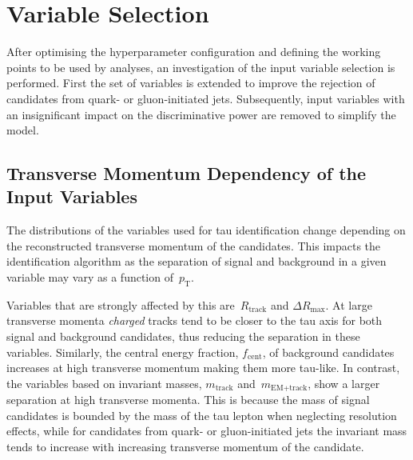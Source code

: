 \section{Variable Selection}
\label{sec:bdt_variable_selection}

After optimising the hyperparameter configuration and defining the working
points to be used by analyses, an investigation of the input variable selection
is performed. First the set of variables is extended to improve the rejection of
\tauhadvis candidates from quark- or gluon-initiated jets. Subsequently, input
variables with an insignificant impact on the discriminative power are removed
to simplify the model.

\subsection{Transverse Momentum Dependency of the Input Variables}
\label{sec:bdt_incl_pt}


The distributions of the variables used for tau identification change depending
on the reconstructed transverse momentum of the \tauhadvis candidates. This
impacts the identification algorithm as the separation of signal and background
in a given variable may vary as a function of~$p_\text{T}$.

Variables that are strongly affected by this are~$R_\text{track}$ and
$\Delta R_\text{max}$. At large transverse momenta \emph{charged} tracks tend to
be closer to the tau axis for both signal and background candidates, thus
reducing the separation in these variables. Similarly, the central energy
fraction, $f_\text{cent}$, of background candidates increases at high transverse
momentum making them more tau-like. In contrast, the variables based on
invariant masses, $m_\text{track}$ and~$m_\text{EM+track}$, show a larger
separation at high transverse momenta. This is because the mass of signal
candidates is bounded by the mass of the tau lepton when neglecting resolution
effects, while for candidates from quark- or gluon-initiated jets the invariant
mass tends to increase with increasing transverse momentum of the \tauhadvis
candidate.

